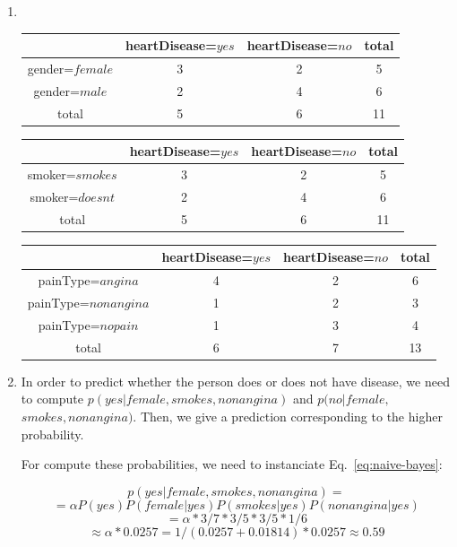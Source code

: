 \begin{enumerate}

\item \


\begin{tabular}{|c|c|c|c|}\hline
& heartDisease=$yes$ & heartDisease=$no$ & total \\ \hline
gender=$female$ & 3 & 2 & 5 \\ \hline
gender=$male$ & 2 & 4 & 6 \\ \hline
total & 5 & 6 & 11 \\ \hline
\end{tabular}

\vspace{0.5cm}

\begin{tabular}{|c|c|c|c|}\hline
& heartDisease=$yes$ & heartDisease=$no$ & total \\ \hline
smoker=$smokes$ & 3 & 2 & 5 \\ \hline
smoker=$doesnt$ & 2 & 4 & 6 \\ \hline
total & 5 & 6 & 11 \\ \hline
\end{tabular}

\vspace{0.5cm}

\begin{tabular}{|c|c|c|c|}\hline
& heartDisease=$yes$ & heartDisease=$no$ & total \\ \hline
painType=$angina$& 4 & 2 & 6 \\ \hline
painType=$nonangina$& 1 & 2 & 3 \\ \hline
painType=$nopain$ & 1 & 3 & 4 \\ \hline
total & 6 & 7 & 13 \\ \hline
\end{tabular}

\vspace{0.5cm}

\item  In order to predict whether the person does or does not have disease, we need to compute $p(yes|female,smokes,nonangina)$ and $p(no|female,$ $smokes,nonangina)$. Then, we give a prediction corresponding to the higher probability.

For compute these probabilities, we need to instanciate Eq.~\ref{eq:naive-bayes}:

\[p(yes|female,smokes,nonangina) =\]
\[= \alpha P(yes) P(female|yes) P(smokes|yes) P(nonangina|yes)\]
\[= \alpha * 3/7 * 3/5 * 3/5 * 1/6\]
\[\approx \alpha * 0.0257 = 1 / (0.0257 + 0.01814) * 0.0257 \approx 0.59\]


\end{enumerate}
